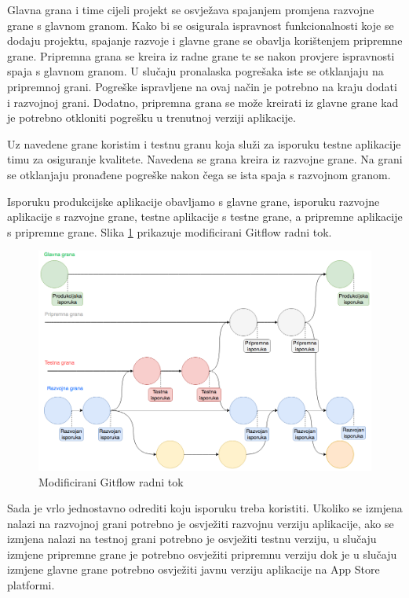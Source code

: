 \documentclass[times, utf8, diplomski, numeric]{fer}
\begin{document}
\begin{appendices}
Glavna grana i time cijeli projekt se osvježava spajanjem promjena razvojne grane s glavnom granom. Kako bi se osigurala ispravnost funkcionalnosti koje se dodaju projektu, spajanje razvoje i glavne grane se obavlja korištenjem pripremne grane. Pripremna grana se kreira iz radne grane te se nakon provjere ispravnosti spaja s glavnom granom. U slučaju pronalaska pogrešaka iste se otklanjaju na pripremnoj grani. Pogreške ispravljene na ovaj način je potrebno na kraju dodati i razvojnoj grani. Dodatno, pripremna grana se može kreirati iz glavne grane kad je potrebno otkloniti pogrešku u trenutnoj verziji aplikacije.

Uz navedene grane koristim i testnu granu koja služi za isporuku testne aplikacije timu za osiguranje kvalitete. Navedena se grana kreira iz razvojne grane. Na grani se otklanjaju pronađene pogreške nakon čega se ista spaja s razvojnom granom.

Isporuku produkcijske aplikacije obavljamo s glavne grane, isporuku razvojne aplikacije s razvojne grane, testne aplikacije s testne grane, a pripremne aplikacije s pripremne grane. Slika \ref{fig:ModificiraniGitflowTokRaka} prikazuje modificirani Gitflow radni tok.

\begin{figure}
\centering
\includegraphics[scale=0.4]{ModificiraniGitflowTokRaka}
\caption{Modificirani Gitflow radni tok}
\label{fig:ModificiraniGitflowTokRaka}
\end{figure}

Sada je vrlo jednostavno odrediti koju isporuku treba koristiti. Ukoliko se izmjena nalazi na razvojnoj grani potrebno je osvježiti razvojnu verziju aplikacije, ako se izmjena nalazi na testnoj grani potrebno je osvježiti testnu verziju, u slučaju izmjene pripremne grane je potrebno osvježiti pripremnu verziju dok je u slučaju izmjene glavne grane potrebno osvježiti javnu verziju aplikacije na App Store platformi.


\end{appendices}
\end{document}
